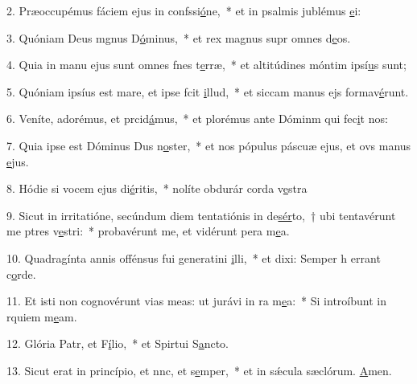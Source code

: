2. Præoccupémus fáciem ejus in confssi\uline{ó}ne,~* et in psalmis jublémus \uline{e}i:\par 
3. Quóniam Deus mgnus D\uline{ó}minus,~* et rex magnus supr omnes d\uline{e}os.\par 
4. Quia in manu ejus sunt omnes fnes t\uline{e}rræ,~* et altitúdines móntim ipsí\uline{u}s sunt;\par 
5. Quóniam ipsíus est mare, et ipse fcit \uline{i}llud,~* et siccam manus ejs formav\uline{é}runt.\par 
6. Veníte, adorémus, et prcid\uline{á}mus,~* et plorémus ante Dóminm qui fec\uline{i}t nos:\par 
7. Quia ipse est Dóminus Dus n\uline{o}ster,~* et nos pópulus páscuæ ejus, et ovs manus \uline{e}jus.\par 
8. Hódie si vocem ejus di\uline{é}ritis,~* nolíte obdurár corda v\uline{e}stra\par 
9. Sicut in irritatióne, secúndum diem tentatiónis in de\uline{sér}to,~† ubi tentavérunt me ptres v\uline{e}stri:~* probavérunt me, et vidérunt pera m\uline{e}a.\par 
10. Quadragínta annis offénsus fui generatini \uline{i}lli,~* et dixi: Semper h errant c\uline{o}rde.\par 
11. Et isti non cognovérunt vias meas: ut jurávi in ra m\uline{e}a:~* Si introíbunt in rquiem m\uline{e}am.\par 
12. Glória Patr, et F\uline{í}lio,~* et Spirtui S\uline{a}ncto.\par 
13. Sicut erat in princípio, et nnc, et s\uline{e}mper,~* et in sǽcula sæclórum. \uline{A}men.\par 

